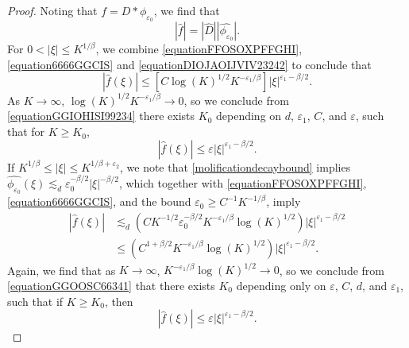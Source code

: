 \documentclass[12pt,reqno]{article}
\numberwithin{equation}{section}
\begin{document}
\begin{proof}
    Noting that $f = D * \phi_{\varepsilon_0}$, we find that
    \begin{equation} \label{equation6666GGCIS}
        |\widehat{f}| = |\widehat{D}| |\widehat{\phi_{\varepsilon_0}}|.
    \end{equation}
    For $0 < |\xi| \leq K^{1/\beta}$, we combine \eqref{equationFFOSOXPFFGHI}, \eqref{equation6666GGCIS} and \eqref{equationDIOJAOIJVIV23242} to conclude that
    \begin{equation} \label{equationGGIOHISI99234}
        |\widehat{f}(\xi)| \leq \left[ C \log(K)^{1/2} K^{-\varepsilon_1/\beta} \right] |\xi|^{\varepsilon_1 - \beta/2}.
    \end{equation}
    As $K \to \infty$, $\log(K)^{1/2} K^{-\varepsilon_1/\beta} \to 0$, so we conclude from \eqref{equationGGIOHISI99234} there exists $K_0$ depending on $d$, $\varepsilon_1$, $C$, and $\varepsilon$, such that for $K \geq K_0$,
    \begin{equation} \label{equation663sdDDDCC}
        |\widehat{f}(\xi)| \leq \varepsilon |\xi|^{\varepsilon_1-\beta/2}.
    \end{equation}
    If $K^{1/\beta} \leq |\xi| \leq K^{1/\beta + \varepsilon_2}$, we note that \eqref{molificationdecaybound} implies $\widehat{\phi_{\varepsilon_0}}(\xi) \lesssim_d \varepsilon_0^{-\beta/2} |\xi|^{-\beta/2}$, which together with \eqref{equationFFOSOXPFFGHI}, \eqref{equation6666GGCIS}, and the bound $\varepsilon_0 \geq C^{-1} K^{-1/\beta}$, imply
    \begin{equation} \label{equationGGOOSC66341}
    \begin{split}
        |\widehat{f}(\xi)| &\lesssim_d \left( C K^{-1/2} \varepsilon_0^{-\beta/2} K^{-\varepsilon_1/\beta} \log(K)^{1/2} \right) |\xi|^{\varepsilon_1-\beta/2}\\
        &\leq \left( C^{1 + \beta/2} K^{-\varepsilon_1/\beta} \log(K)^{1/2} \right) |\xi|^{\varepsilon_1 - \beta/2}.
    \end{split}
    \end{equation}
    Again, we find that as $K \to \infty$, $K^{-\varepsilon_1/\beta} \log(K)^{1/2} \to 0$, so we conclude from \eqref{equationGGOOSC66341} that there exists $K_0$ depending only on $\varepsilon$, $C$, $d$, and $\varepsilon_1$, such that if $K \geq K_0$, then
    \begin{equation} \label{equationUUUDDDCII777}
        |\widehat{f}(\xi)| \leq \varepsilon |\xi|^{\varepsilon_1-\beta/2}.

\end{equation}
\end{proof}
\end{document}

